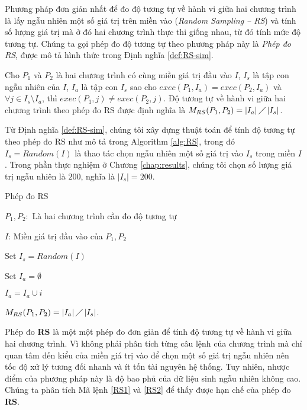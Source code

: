 Phương pháp đơn giản nhất để đo độ tương tự về hành vi giữa hai chương
trình là lấy ngẫu nhiên một số giá trị trên miền vào (\emph{Random
  Sampling -- RS}) và tính số lượng giá trị mà ở đó hai chương trình
thực thi giống nhau, từ đó tính mức độ tương tự. Chúng ta gọi phép đo
độ tương tự theo phương pháp này là \emph{Phép đo RS}, được mô tả hình thức
trong Định nghĩa \ref{def:RS-sim}.

\begin{definition}[Phép đo RS]
  \label{def:RS-sim}
  Cho $P_{1}$ và $P_{2}$ là hai chương trình có cùng miền giá trị đầu
  vào $I$, $I_{s}$ là tập con ngẫu nhiên của $I$, $I_{a}$ là tập con
  $I_{s}$ sao cho $exec(P_{1}, I_a) = exec(P_{2}, I_a)$ và
  $\forall j \in I_{s} \setminus I_{a}$, thì
  $exec(P_{1}, j) \neq exec(P_{2}, j)$. Độ tương tự về hành vi giữa
  hai chương trình theo phép đo RS được định nghĩa là
  $M_{RS}(P_{1}, P_{2}) = \left|I_{a}\right| \diagup
  \left|I_{s}\right| $.
\end{definition}

Từ Định nghĩa \ref{def:RS-sim}, chúng tôi xây dựng thuật toán để tính
độ tương tự theo phép đo RS như mô tả trong Algorithm \ref{alg:RS},
trong đó $I_s = Random(I)$ là thao tác chọn ngẫu nhiên một số giá trị
vào $I_s$ trong miền $I$. Trong phần thực nghiệm ở Chương
\ref{chap:results}, chúng tôi chọn số lượng giá trị ngẫu nhiên là
$200$, nghĩa là $|I_s| = 200$.

\begin{algorithm}[H]
  \caption{Phép đo RS}
  \label{alg:RS}
  \begin{algorithmic}
  \item $P_{1}, P_{2}:$ Là hai chương trình cần đo độ tương tự
  \item $I$: Miền giá trị đầu vào của $P_{1}, P_{2}$
  \item Set $I_{s} = Random(I)$ 
  \item Set $I_{a} = \emptyset$

         \State
        $I_{a} = I_{a} \cup i$
    \EndIf
    \EndFor
  \item
    $M_{RS}(P_{1}, P_{2}) = \left|I_{a}\right| \diagup
    \left|I_{s}\right| $.
  \end{algorithmic}
\end{algorithm}


Phép đo \textbf{RS} là một một phép đo đơn giản để tính độ tương tự về hành vi giữa hai chương trình. Vì không phải phân tích từng câu lệnh của chương trình mà chỉ quan tâm đến kiểu của miền giá trị vào để chọn một số giá trị ngẫu nhiên nên tốc độ xử lý tương đối nhanh và ít tốn tài nguyên hệ thống. Tuy nhiên, nhược điểm của phương pháp này là độ bao phủ của dữ liệu sinh ngẫu nhiên không cao. Chúng ta phân tích Mã lệnh \ref{RS1} và \ref{RS2} để thấy được hạn chế của phép đo \textbf{RS}.

